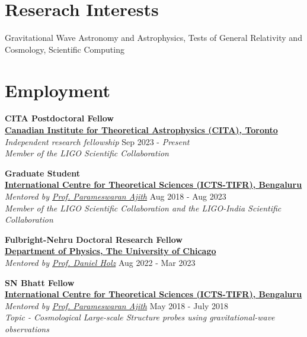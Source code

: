\documentclass[11pt, margin, centered, letterpaper]{res}
\begin{document}
\begin{resume}

\section{Reserach Interests}
Gravitational Wave Astronomy and Astrophysics, Tests of General Relativity and Cosmology, Scientific Computing 
\\

\section{Employment}
\textbf{CITA Postdoctoral Fellow}
\\
\textbf{\href{https://www.icts.res.in/}{Canadian Institute for Theoretical Astrophysics (CITA), Toronto}}\\
\emph{Independent research fellowship} \hfill Sep 2023 - \textit{Present}\\
\textit{Member of the LIGO Scientific Collaboration}

\textbf{Graduate Student}
\\
\textbf{\href{https://www.icts.res.in/}{International Centre for Theoretical Sciences (ICTS-TIFR), Bengaluru}}\\
\emph{Mentored by \href{https://home.icts.res.in/~ajith/Home.html}{Prof. Parameswaran Ajith}} \hfill Aug 2018 - Aug 2023\\
\textit{Member of the LIGO Scientific Collaboration and the LIGO-India Scientific Collaboration}

\textbf{Fulbright-Nehru Doctoral Research Fellow}
\\
\textbf{\href{https://www.icts.res.in/}{Department of Physics, The University of Chicago}}\\
\emph{Mentored by \href{https://home.icts.res.in/~ajith/Home.html}{Prof. Daniel Holz}} \hfill Aug 2022 - Mar 2023

\textbf{SN Bhatt Fellow}
\\
\textbf{\href{https://www.icts.res.in/}{International Centre for Theoretical Sciences (ICTS-TIFR), Bengaluru}}\\
\emph{Mentored by \href{https://home.icts.res.in/~ajith/Home.html}{Prof. Parameswaran Ajith}} \hfill May 2018 - July 2018\\
\textit{Topic - Cosmological Large-scale Structure probes using gravitational-wave observations}


\end{resume}
\end{document}

